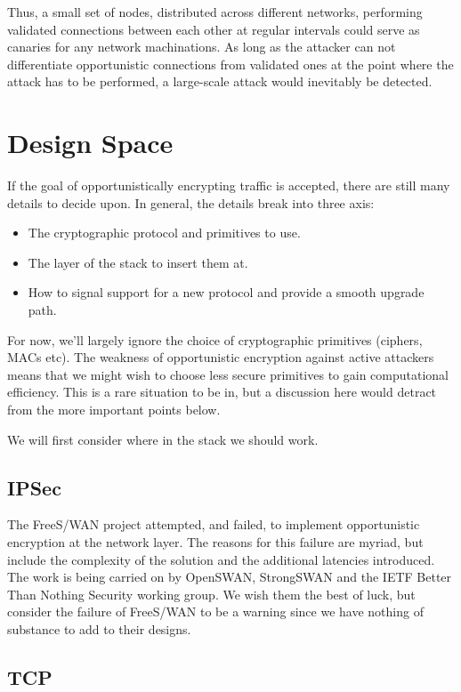 \documentclass[conference]{IEEEtran}
\begin{document}
Thus, a small set of nodes, distributed across different networks, performing
validated connections between each other at regular intervals could serve as
canaries for any network machinations. As long as the attacker can not
differentiate opportunistic connections from validated ones at the point where
the attack has to be performed, a large-scale attack would inevitably be
detected.

\section{Design Space}

If the goal of opportunistically encrypting traffic is accepted, there are
still many details to decide upon. In general, the details break into three
axis:

\begin{itemize}
\item The cryptographic protocol and primitives to use.
\item The layer of the stack to insert them at.
\item How to signal support for a new protocol and provide a smooth upgrade path.
\end{itemize}

For now, we'll largely ignore the choice of cryptographic primitives (ciphers,
MACs etc). The weakness of opportunistic encryption against active attackers
means that we might wish to choose less secure primitives to gain computational
efficiency. This is a rare situation to be in, but a discussion here would
detract from the more important points below.

We will first consider where in the stack we should work.

\subsection{IPSec}

The FreeS/WAN project\cite{freeswan} attempted, and
failed\cite{freeswanfailure}, to implement
opportunistic encryption at the network layer. The reasons for this failure are
myriad, but include the complexity of the solution and the additional latencies
introduced. The work is being carried on by OpenSWAN, StrongSWAN and the IETF
Better Than Nothing Security working group\cite{btns}. We wish them the best of
luck, but consider the failure of FreeS/WAN to be a warning since we have
nothing of substance to add to their designs.

\subsection{TCP}
\end{document}
